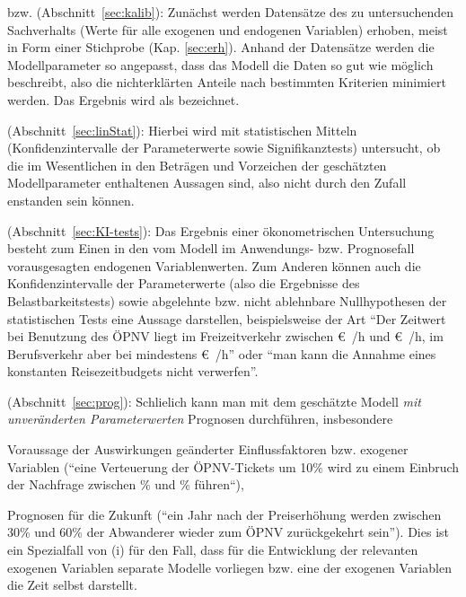 \item {} bzw. 
(Abschnitt~\ref{sec:kalib}):
Zun\"achst werden Datens\"atze des  zu untersuchenden Sachverhalts (Werte f\"ur
alle exogenen und endogenen Variablen) erhoben, 
meist in Form einer
Stichprobe (Kap. \ref{sec:erh}). Anhand der Datens\"atze 
werden die Modellparameter
so angepasst, dass das Modell die Daten so gut wie m\"oglich
beschreibt, also die nichterkl\"arten Anteile nach bestimmten
Kriterien minimiert werden.  Das Ergebnis wird als
 bezeichnet.

\item {}
(Abschnitt~\ref{sec:linStat}): Hierbei wird mit
statistischen Mitteln (Konfidenzintervalle der Parameterwerte sowie
Signifikanztests) untersucht, ob die im Wesentlichen in den 
Betr\"agen und Vorzeichen der gesch\"atzten 
Modellparameter enthaltenen Aussagen
 sind, also nicht durch den Zufall enstanden sein
k\"onnen.

\item {} (Abschnitt~\ref{sec:KI-tests}):
Das Ergebnis einer \"okonometrischen Untersuchung besteht zum Einen in
den vom Modell im Anwendungs- bzw. Prognosefall vorausgesagten
endogenen Variablenwerten. Zum Anderen k\"onnen auch 
 die Konfidenzintervalle der Parameterwerte (also die Ergebnisse des
Belastbarkeitstests) sowie 
abgelehnte bzw. nicht ablehnbare
Nullhypothesen der statistischen Tests eine Aussage darstellen,
beispielsweise der Art ``Der Zeitwert bei Benutzung des \"OPNV liegt
im Freizeitverkehr 
zwischen \unit[6]{\euro{}/h} und \unit[10]{\euro{}/h}, im
Berufsverkehr aber bei mindestens \unit[15]{\euro{}/h}'' oder ``man
kann die Annahme eines konstanten Reisezeitbudgets nicht verwerfen''.

\item {} (Abschnitt~\ref{sec:prog}): Schlie\3lich
kann man mit dem gesch\"atzte Modell
\emph{mit unver\"anderten Parameterwerten} 
Prognosen durchf\"uhren, insbesondere 
\bi
\item[(i)] Voraussage der Auswirkungen ge\"anderter Einflussfaktoren
bzw. exogener Variablen
(``eine
Verteuerung der \"OPNV-Tickets um 10\% wird zu einem Einbruch der
Nachfrage zwischen \unit[6]{\%} und \unit[9]{\%} f\"uhren``),
\item[(ii)] 
Prognosen f\"ur die Zukunft (``ein Jahr nach der Preiserh\"ohung werden
zwischen 30\% und 60\% 
der Abwanderer wieder zum \"OPNV zur\"uckgekehrt sein'').
Dies ist ein Spezialfall von (i) f\"ur den Fall, dass f\"ur die
Entwicklung der relevanten exogenen Variablen separate Modelle
vorliegen bzw. eine der exogenen Variablen die Zeit selbst
darstellt.
\ei
\eenum
%


